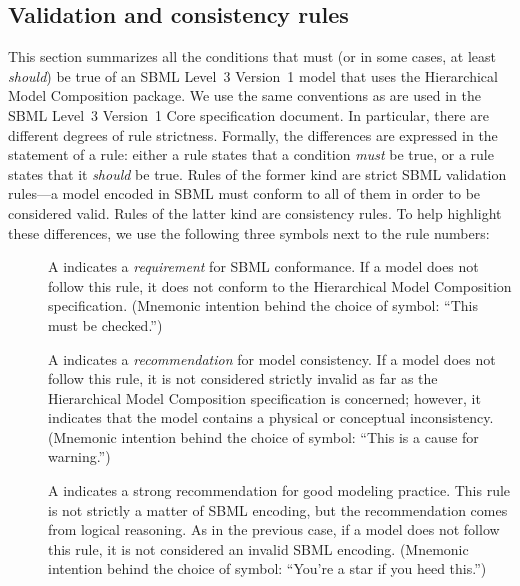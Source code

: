 \subsection{Validation and consistency rules}
\label{validation-rules}

This section summarizes all the conditions that must (or in some cases, at least \emph{should}) be true of an SBML Level~3 Version~1 model that uses the Hierarchical Model Composition package. We use the same conventions as are used in the SBML Level~3 Version~1 Core specification document. In particular, there are different degrees of rule strictness. Formally, the differences are expressed in the statement of a rule: either a rule states that a condition \emph{must} be true, or a rule states that it \emph{should} be true. Rules of the former kind are strict SBML validation rules---a model encoded in SBML must conform to all of them in order to be considered valid. Rules of the latter kind are consistency rules. To help highlight these differences, we use the following three symbols next to the rule numbers:

\begin{description}

\item[\hspace*{6.5pt}\vSymbol\vsp] A \vSymbolName indicates a \emph{requirement} for SBML conformance. If a model does not follow this rule, it does not conform to the Hierarchical Model Composition specification. (Mnemonic intention behind the choice of symbol: ``This must be checked.'')

\item[\hspace*{6.5pt}\cSymbol\csp] A \cSymbolName indicates a \emph{recommendation} for model consistency. If a model does not follow this rule, it is not considered strictly invalid as far as the Hierarchical Model Composition specification is concerned; however, it indicates that the model contains a physical or conceptual inconsistency. (Mnemonic intention behind the choice of symbol: ``This is a cause for warning.'')

\item[\hspace*{6.5pt}\mSymbol\msp] A \mSymbolName indicates a strong recommendation for good modeling practice. This rule is not strictly a matter of SBML encoding, but the recommendation comes from logical reasoning. As in the previous case, if a model does not follow this rule, it is not considered an invalid SBML encoding. (Mnemonic intention behind the choice of symbol: ``You're a star if you heed this.'')

\end{description}

